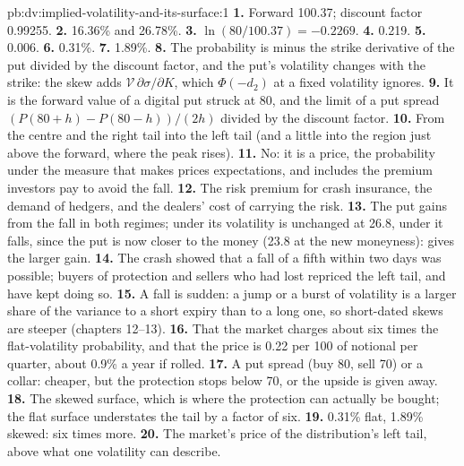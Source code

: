\begin{solution}{pb:dv:implied-volatility-and-its-surface:1}
\textbf{1.} Forward 100.37; discount factor 0.99255.
\textbf{2.} 16.36\% and 26.78\%.
\textbf{3.} $\ln(80/100.37)=-0.2269$.
\textbf{4.} 0.219.
\textbf{5.} 0.006.
\textbf{6.} 0.31\%.
\textbf{7.} 1.89\%.
\textbf{8.} The probability is minus the strike derivative of the put divided by the discount
factor, and the put's volatility changes with the strike: the skew adds $\mathcal V\,
\partial\sigma/\partial K$, which $\Phi(-d_2)$ at a fixed volatility ignores.
\textbf{9.} It is the forward value of a digital put struck at 80, and the limit of a put spread
$(P(80+h)-P(80-h))/(2h)$ divided by the discount factor.
\textbf{10.} From the centre and the right tail into the left tail (and a little into the region
just above the forward, where the peak rises).
\textbf{11.} No: it is a price, the probability under the measure that makes prices expectations,
and includes the premium investors pay to avoid the fall.
\textbf{12.} The risk premium for crash insurance, the demand of hedgers, and the dealers' cost of
carrying the risk.
\textbf{13.} The put gains from the fall in both regimes; under  its volatility is
unchanged at 26.8, under  it falls, since the put is now closer to the money
(23.8 at the new moneyness):  gives the larger gain.
\textbf{14.} The crash showed that a fall of a fifth within two days was possible; buyers of
protection and sellers who had lost repriced the left tail, and have kept doing so.
\textbf{15.} A fall is sudden: a jump or a burst of volatility is a larger share of the variance
to a short expiry than to a long one, so short-dated skews are steeper (chapters 12--13).
\textbf{16.} That the market charges about six times the flat-volatility probability, and that
the price is 0.22 per 100 of notional per quarter, about 0.9\% a year if rolled.
\textbf{17.} A put spread (buy 80, sell 70) or a collar: cheaper, but the protection stops below
70, or the upside is given away.
\textbf{18.} The skewed surface, which is where the protection can actually be bought; the flat
surface understates the tail by a factor of six.
\textbf{19.} 0.31\% flat, 1.89\% skewed: six times more.
\textbf{20.} The market's price of the distribution's left tail, above what one volatility can
describe.
\end{solution}

